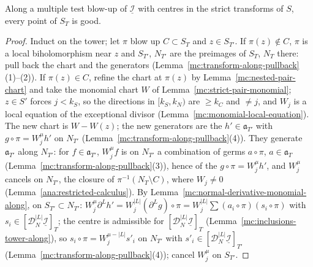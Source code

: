 \begin{lemma}
\label{mc:normal-coefficient-step-along}
\leanok
Along a multiple test blow-up of \(\underline{\mathcal I}\) with centres in the strict transforms of \(S\), every point of \(S_T\) is good.
\end{lemma}
\begin{proof}
\leanok
Induct on the tower; let \(\pi\) blow up \(C\subset S_T\) and \(z\in S_{T'}\). If \(\pi(z)\notin C\), \(\pi\) is a local biholomorphism near \(z\) and \(S_{T'}\), \(N_{T'}\) are the
preimages of \(S_T\), \(N_T\) there: pull back the chart and the generators (Lemma~\ref{mc:transform-along-pullback}(1)--(2)). If \(\pi(z)\in C\), refine the chart at \(\pi(z)\)
by Lemma~\ref{mc:nested-pair-chart} and take the monomial chart \(W\) of Lemma~\ref{mc:strict-pair-monomial}; \(z\in S'\) forces \(j<k_S\), so the directions in
\([k_S,k_N)\) are \(\ge k_C\) and \(\ne j\), and \(W_j\) is a local equation of the exceptional divisor (Lemma~\ref{mc:monomial-local-equation}). The new chart is \(W-W(z)\); the new
generators are the \(h'\in\mathfrak a_{T'}\) with \(g\circ\pi=W_j^\mu h'\) on \(N_{T'}\) (Lemma~\ref{mc:transform-along-pullback}(4)). They generate \(\mathfrak a_{T'}\) along
\(N_{T'}\): for \(f\in\mathfrak a_{T'}\), \(W_j^\mu f\) is on \(N_{T'}\) a combination of germs \(a\circ\pi\), \(a\in\mathfrak a_T\) (Lemma~\ref{mc:transform-along-pullback}(3)),
hence of the \(g\circ\pi=W_j^\mu h'\), and \(W_j^\mu\) cancels on \(N_{T'}\), the closure of \(\pi^{-1}(N_T\setminus C)\), where \(W_j\ne0\) (Lemma~\ref{ana:restricted-calculus}). By
Lemma~\ref{mc:normal-derivative-monomial-along}, on \(S_{T'}\subset N_{T'}\): \(W_j^\mu\partial^Lh'=W_j^{|L|}(\partial^Lg)\circ\pi=W_j^{|L|}\sum(a_i\circ\pi)(s_i\circ\pi)\) with
\(s_i\in[\mathcal D_N^{|L|}\underline{\mathcal I}]_T\); the centre is admissible for \([\mathcal D_N^{|L|}\underline{\mathcal I}]_T\) (Lemma~\ref{mc:inclusions-tower-along}), so
\(s_i\circ\pi=W_j^{\mu-|L|}s'_i\) on \(N_{T'}\) with \(s'_i\in[\mathcal D_N^{|L|}\underline{\mathcal I}]_{T'}\) (Lemma~\ref{mc:transform-along-pullback}(4)); cancel \(W_j^\mu\) on \(S_{T'}\).
\end{proof}

